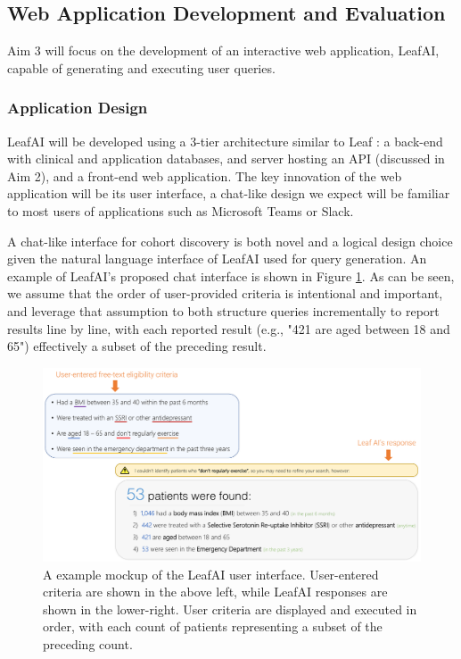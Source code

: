 \documentclass[../main.tex]{subfiles}
\begin{document}
\subsection{Web Application Development and Evaluation}

Aim 3 will focus on the development of an interactive web application, LeafAI, capable of generating and executing user queries. 

\subsubsection{Application Design}

LeafAI will be developed using a 3-tier architecture similar to Leaf \cite{dobbins2019leaf}: a back-end with clinical and application databases, and server hosting an API (discussed in Aim 2), and a front-end web application. The key innovation of the web application will be its user interface, a chat-like design we expect will be familiar to most users of applications such as Microsoft Teams or Slack.

A chat-like interface for cohort discovery is both novel and a logical design choice given the natural language interface of LeafAI used for query generation. An example of LeafAI's proposed chat interface is shown in Figure \ref{aim3_fig_demo}. As can be seen, we assume that the order of user-provided criteria is intentional and important, and leverage that assumption to both structure queries incrementally to report results line by line, with each reported result (e.g., "421 are aged between 18 and 65") effectively a subset of the preceding result.

\begin{figure}[h!]
  \includegraphics[scale=0.58]{Figures/Aim3/aim3_demo.pdf}  
  \caption{A example mockup of the LeafAI user interface. User-entered criteria are shown in the above left, while LeafAI responses are shown in the lower-right. User criteria are displayed and executed in order, with each count of patients representing a subset of the preceding count.}
\label{aim3_fig_demo}
\end{figure}
\end{document}
